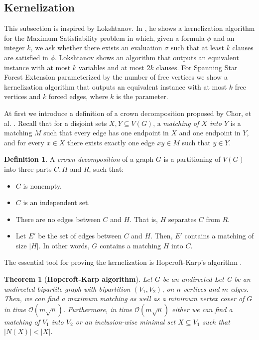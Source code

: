 \documentclass[en]{pracamgr}
\newtheorem{theorem}{Theorem}
\theoremstyle{definition}
\newtheorem{definition}{Definition}
\newcommand{\ssfep}{{\sc Spanning Star Forest Extension}}
\begin{document}
\subsection{Kernelization}

This subsection is inspired by Lokshtanov. In \cite{MAXSATKERNEL}, he shows a kernelization algorithm for the {\sc Maximum Satisfiability} problem in which, given a formula $\phi$ and an integer $k$, we ask whether there exists an evaluation $\sigma$ such that at least $k$ clauses are satisfied in $\phi$. Lokshtanov shows an algorithm that outputs an equivalent instance with at most $k$ variables and at most $2k$ clauses. For \ssfep{} parameterized by the number of free vertices we show a kernelization algorithm that outputs an equivalent instance with at most $k$ free vertices and $k$ forced edges, where $k$ is the parameter.

At first we introduce a definition of a crown decomposition proposed by Chor, et al. \cite{Crown}. Recall that for a disjoint sets $X,Y \subseteq V(G)$, a \textit{matching of $X$ into $Y$} is a matching $M$ such that every edge has one endpoint in $X$ and one endpoint in $Y$, and for every $x \in X$ there exists exactly one edge $xy \in M$ such that $y \in Y$.

\begin{definition}
	A \textit{crown decomposition} of a graph $G$ is a partitioning of $V(G)$ into three parts $C,H$ and $R$, such that:
	\begin{itemize}
		\item $C$ is nonempty.
		\item $C$ is an independent set.
		\item There are no edges between $C$ and $H$. That is, $H$ separates $C$ from $R$.
		\item Let $E'$ be the set of edges between $C$ and $H$. Then, $E'$ contains a matching of size $|H|$. In other words, $G$ contains a matching $H$ into $C$.
	\end{itemize}
\end{definition}

The essential tool for proving the kernelization is Hopcroft-Karp's algorithm \cite{Hopcroft-Karp}.

\begin{theorem}[\textbf{Hopcroft-Karp algorithm}]
	Let $G$ be an undirected Let G be an undirected bipartite graph with bipartition $(V_1,V_2)$, on $n$ vertices and $m$ edges.	Then, we can find a maximum matching as well as a minimum vertex cover of $G$ in time $\mathcal{O}(m\sqrt{n})$. Furthermore, in time $\mathcal{O}(m\sqrt{n})$ either we can find a matching of $V_1$ into $V_2$ or an inclusion-wise minimal set $X \subseteq V_1$ such that $|N(X)| < |X|$.
\end{theorem}
\end{document}
